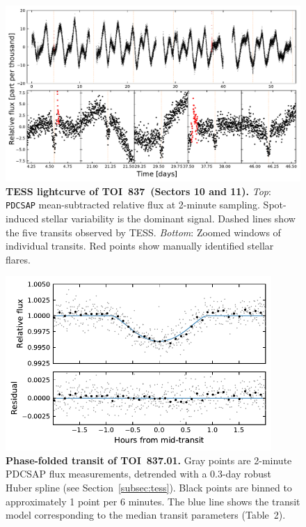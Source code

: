 \documentclass[12pt,twocolumn,tighten]{aastex62}
\newcommand{\tn}{TOI~837} %
\newcommand{\pn}{TOI~837.01} %
\begin{document}
\begin{figure}[t!]
	\begin{center}
		\leavevmode
		\includegraphics[width=1\textwidth]{f1.pdf}
	\end{center}
	\vspace{-0.7cm}
	\caption{
    {\bf TESS lightcurve of \tn\ (Sectors 10 and 11).}
		{\it Top}: \texttt{PDCSAP} mean-subtracted relative flux at 2-minute
		sampling. Spot-induced stellar variability is the dominant signal.  Dashed
		lines show the five transits observed by TESS.
    {\it Bottom}: Zoomed windows of individual transits.
    Red points show manually identified stellar flares.
		\label{fig:rawzoom}
	}
\end{figure}

\begin{figure}[t!]
	\begin{center}
		\leavevmode
		\includegraphics[width=0.9\textwidth]{f2.pdf}
	\end{center}
	\vspace{-0.7cm}
	\caption{
    {\bf Phase-folded transit of \pn.} Gray points are
    2-minute PDCSAP flux measurements, detrended with
    a 0.3-day robust Huber spline (see Section~\ref{subsec:tess}).
    Black points are binned to approximately 1 point per 6 minutes.
    The blue line shows the transit model corresponding to the median
    transit parameters (Table~2).
    \label{fig:phasefold}
	}
\end{figure}
\end{document}

